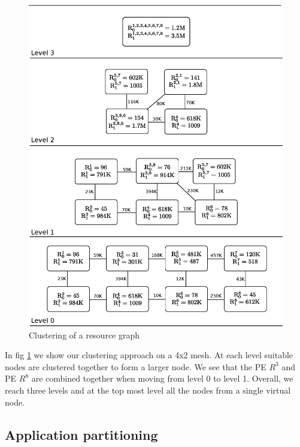 \begin{figure}[ht]
  \includegraphics[scale=0.43]{./figures/resource}
  \caption{Clustering of a resource graph}
  \label{fig:res}
\end{figure}

In fig \ref{fig:res} we show our clustering approach on a 4x2 mesh. At
each level suitable nodes are clustered together to form a larger node.
We see that the PE $ R^3 $ and PE $ R^8 $ are combined together
when moving from level 0 to level 1. Overall, we reach three levels
and at the top most level all the nodes from a single virtual node.

\subsection{Application partitioning}
\label{sec:appl-part}




